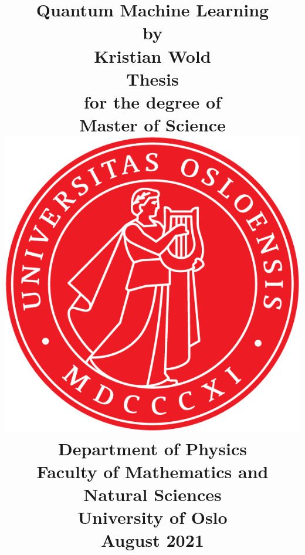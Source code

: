 \title{
    \Large \textbf{Quantum Machine Learning}
    \\[8 pt]
    \large by
    \\ [8 pt]
    \large Kristian Wold
    \\ [40 pt]
    \large \textbf{Thesis}
    \\ [8 pt]
    \large for the degree of
    \\ [8 pt]
    \large \textbf{Master of Science}
    \\ [30 pt]
    \includegraphics[scale=0.9]{latex-report/3_Images/Logo/UiO/UiO_Segl_300dpi.png}
    \\ [30 pt]
    \large Department of Physics
    \\ [8 pt]
    \large Faculty of Mathematics and Natural Sciences
    \\ [8 pt]
    \large University of Oslo
    \\ [15 pt]
    \large August 2021
}%

\author{\vspace{-5ex}}
\date{\vspace{-5ex}}

\maketitle